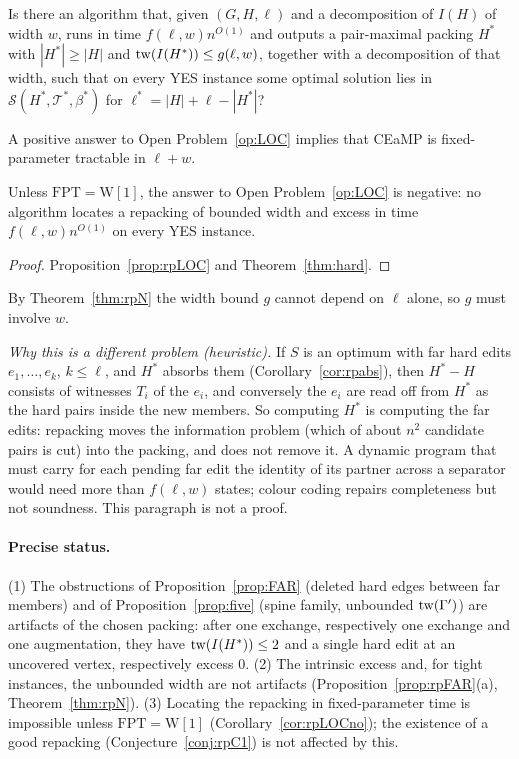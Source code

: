 \begin{problem}[LOC: locating the repacking; \textbf{no, unless $\mathrm{FPT}=\mathrm{W[1]}$}]\label{op:LOC}
Is there an algorithm that, given $(G,H,\ell)$ and a decomposition of $I(H)$ of width $w$, runs in time $f(\ell,w)n^{O(1)}$ and outputs a pair-maximal packing $H^*$ with $|H^*|\ge|H|$ and $\mathrm{tw}(I(H^*))\le g(\ell,w)$, together with a decomposition of that width, such that on every YES instance some optimal solution lies in $\mathcal S(H^*,\mathcal T^*,\beta^*)$ for $\ell^*=|H|+\ell-|H^*|$?
\end{problem}
\begin{proposition}\label{prop:rpLOC}
A positive answer to Open Problem~\ref{op:LOC} implies that CEaMP is fixed-parameter tractable in $\ell+w$.
\end{proposition}
\begin{corollary}\label{cor:rpLOCno}
Unless $\mathrm{FPT}=\mathrm{W[1]}$, the answer to Open Problem~\ref{op:LOC} is negative: no algorithm locates a repacking of bounded width and excess in time $f(\ell,w)n^{O(1)}$ on every YES instance.
\end{corollary}
\begin{proof}
Proposition~\ref{prop:rpLOC} and Theorem~\ref{thm:hard}.
\end{proof}
By Theorem~\ref{thm:rpN} the width bound $g$ cannot depend on $\ell$ alone, so $g$ must involve $w$.

\emph{Why this is a different problem (heuristic).} If $S$ is an optimum with far hard edits $e_1,\dots,e_k$, $k\le\ell$, and $H^*$ absorbs them (Corollary~\ref{cor:rpabs}), then $H^*-H$ consists of witnesses $T_i$ of the $e_i$, and conversely the $e_i$ are read off from $H^*$ as the hard pairs inside the new members. So computing $H^*$ is computing the far edits: repacking moves the information problem (which of about $n^2$ candidate pairs is cut) into the packing, and does not remove it. A dynamic program that must carry for each pending far edit the identity of its partner across a separator would need more than $f(\ell,w)$ states; colour coding repairs completeness but not soundness. This paragraph is not a proof.

\paragraph{Precise status.} (1) The obstructions of Proposition~\ref{prop:FAR} (deleted hard edges between far members) and of Proposition~\ref{prop:five} (spine family, unbounded $\mathrm{tw}(\Gamma')$) are artifacts of the chosen packing: after one exchange, respectively one exchange and one augmentation, they have $\mathrm{tw}(I(H^*))\le2$ and a single hard edit at an uncovered vertex, respectively excess $0$. (2) The intrinsic excess and, for tight instances, the unbounded width are not artifacts (Proposition~\ref{prop:rpFAR}(a), Theorem~\ref{thm:rpN}). (3) Locating the repacking in fixed-parameter time is impossible unless $\mathrm{FPT}=\mathrm{W[1]}$ (Corollary~\ref{cor:rpLOCno}); the existence of a good repacking (Conjecture~\ref{conj:rpC1}) is not affected by this.
